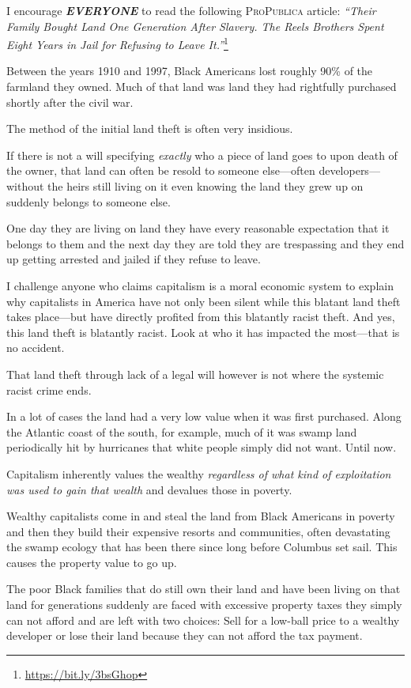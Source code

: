 I encourage \textbf{\emph{EVERYONE}} to read the following \textsc{ProPublica} article: \textit{``Their Family Bought Land One Generation After Slavery. The Reels Brothers Spent Eight Years in Jail for Refusing to Leave It.''}\footnote{\url{https://bit.ly/3bsGhop}}

\bigskip

Between the years 1910 and 1997, Black Americans lost roughly 90\% of the farmland they owned. Much of that land was land they had rightfully purchased shortly after the civil war.

The method of the initial land theft is often very insidious.

If there is not a will specifying \emph{exactly} who a piece of land goes to upon death of the owner, that land can often be resold to someone else---often developers---without the heirs still living on it even knowing the land they grew up on suddenly belongs to someone else.

One day they are living on land they have every reasonable expectation that it belongs to them and the next day they are told they are trespassing and they end up getting arrested and jailed if they refuse to leave.

I challenge anyone who claims capitalism is a moral economic system to explain why capitalists in America have not only been silent while this blatant land theft takes place---but have directly profited from this blatantly racist theft. And yes, this land theft is blatantly racist. Look at who it has impacted the most---that is no accident.

That land theft through lack of a legal will however is not where the systemic racist crime ends.

In a lot of cases the land had a very low value when it was first purchased. Along the Atlantic coast of the south, for example, much of it was swamp land periodically hit by hurricanes that white people simply did not want. Until now.

Capitalism inherently values the wealthy \emph{regardless of what kind of exploitation was used to gain that wealth} and devalues those in poverty.

Wealthy capitalists come in and steal the land from Black Americans in poverty and then they build their expensive resorts and communities, often devastating the swamp ecology that has been there since long before Columbus set sail. This causes the property value to go up.

The poor Black families that do still own their land and have been living on that land for generations suddenly are faced with excessive property taxes they simply can not afford and are left with two choices: Sell for a low-ball price to a wealthy developer or lose their land because they can not afford the tax payment.

